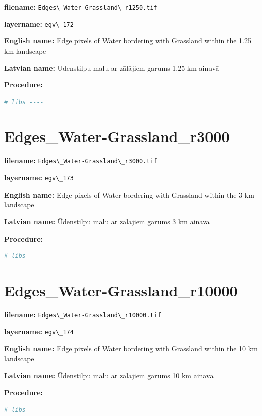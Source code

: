 \documentclass[
]{book}
\newcommand{\passthrough}[1]{#1}
\begin{document}
\textbf{filename:} \passthrough{\lstinline!Edges\_Water-Grassland\_r1250.tif!}

\textbf{layername:} \passthrough{\lstinline!egv\_172!}

\textbf{English name:} Edge pixels of Water bordering with Grassland within the 1.25 km landscape

\textbf{Latvian name:} Ūdenstilpu malu ar zālājiem garums 1,25 km ainavā

\textbf{Procedure:}

\begin{lstlisting}[language=R]
# libs ----
\end{lstlisting}

\section{Edges\_Water-Grassland\_r3000}\label{ch06.173}

\textbf{filename:} \passthrough{\lstinline!Edges\_Water-Grassland\_r3000.tif!}

\textbf{layername:} \passthrough{\lstinline!egv\_173!}

\textbf{English name:} Edge pixels of Water bordering with Grassland within the 3 km landscape

\textbf{Latvian name:} Ūdenstilpu malu ar zālājiem garums 3 km ainavā

\textbf{Procedure:}

\begin{lstlisting}[language=R]
# libs ----
\end{lstlisting}

\section{Edges\_Water-Grassland\_r10000}\label{ch06.174}

\textbf{filename:} \passthrough{\lstinline!Edges\_Water-Grassland\_r10000.tif!}

\textbf{layername:} \passthrough{\lstinline!egv\_174!}

\textbf{English name:} Edge pixels of Water bordering with Grassland within the 10 km landscape

\textbf{Latvian name:} Ūdenstilpu malu ar zālājiem garums 10 km ainavā

\textbf{Procedure:}

\begin{lstlisting}[language=R]
# libs ----
\end{lstlisting}
\end{document}
